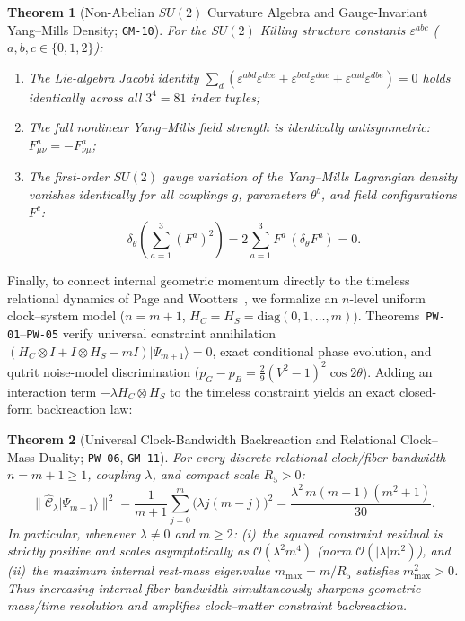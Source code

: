 \documentclass[11pt,a4paper]{article}
\theoremstyle{plain}
\newtheorem{theorem}{Theorem}[section]
\theoremstyle{remark}
\newcommand{\Ccal}{\widehat{\mathcal{C}}}
\newcommand{\code}[1]{\texttt{\small #1}}
\begin{document}
\begin{theorem}[Non-Abelian $SU(2)$ Curvature Algebra and Gauge-Invariant Yang--Mills Density; \code{GM-10}]
\label{thm:gm10}
For the $SU(2)$ Killing structure constants $\varepsilon^{abc}$ ($a,b,c \in \{0,1,2\}$):
\begin{enumerate}
  \item The Lie-algebra Jacobi identity $\sum_d (\varepsilon^{abd}\varepsilon^{dce} + \varepsilon^{bcd}\varepsilon^{dae} + \varepsilon^{cad}\varepsilon^{dbe}) = 0$ holds identically across all $3^4 = 81$ index tuples;
  \item The full nonlinear Yang--Mills field strength is identically antisymmetric: $F^a_{\mu\nu} = -F^a_{\nu\mu}$;
  \item The first-order $SU(2)$ gauge variation of the Yang--Mills Lagrangian density vanishes identically for all couplings $g$, parameters $\theta^b$, and field configurations $F^c$:
  \begin{equation}
    \delta_\theta \!\left(\sum_{a=1}^3 (F^a)^2\right) = 2 \sum_{a=1}^3 F^a\, (\delta_\theta F^a) = 0.
  \end{equation}
\end{enumerate}
\end{theorem}

Finally, to connect internal geometric momentum directly to the timeless relational dynamics of Page and Wootters~\cite{PageWootters1983}, we formalize an $n$-level uniform clock--system model ($n = m+1$, $H_C = H_S = \mathrm{diag}(0,1,\dots,m)$). Theorems~\code{PW-01}--\code{PW-05} verify universal constraint annihilation $(H_C\otimes I + I\otimes H_S - mI)|\Psi_{m+1}\rangle = 0$, exact conditional phase evolution, and qutrit noise-model discrimination ($p_G - p_B = \tfrac{2}{9}(V^2-1)^2\cos 2\theta$). Adding an interaction term $-\lambda H_C \otimes H_S$ to the timeless constraint yields an exact closed-form backreaction law:

\begin{theorem}[Universal Clock-Bandwidth Backreaction and Relational Clock--Mass Duality; \code{PW-06}, \code{GM-11}]
\label{thm:gm11}
For every discrete relational clock/fiber bandwidth $n = m + 1 \ge 1$, coupling $\lambda$, and compact scale $R_5 > 0$:
\begin{equation}
  \bigl\|\Ccal_\lambda |\Psi_{m+1}\rangle\bigr\|^2
  = \frac{1}{m+1}\sum_{j=0}^{m} \bigl(\lambda j(m-j)\bigr)^2
  = \frac{\lambda^2\, m(m-1)(m^2+1)}{30}.
\end{equation}
In particular, whenever $\lambda \neq 0$ and $m \ge 2$: (i)~the squared constraint residual is strictly positive and scales asymptotically as $\mathcal{O}(\lambda^2 m^4)$ (norm $\mathcal{O}(|\lambda| m^2)$), and (ii)~the maximum internal rest-mass eigenvalue $m_{\max} = m/R_5$ satisfies $m_{\max}^2 > 0$. Thus increasing internal fiber bandwidth simultaneously sharpens geometric mass/time resolution and amplifies clock--matter constraint backreaction.
\end{theorem}
\end{document}

